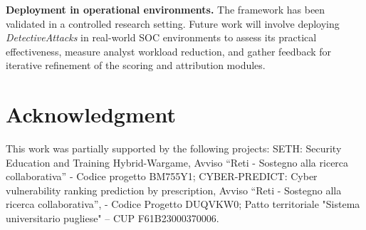 \documentclass[conference]{IEEEtran}
\begin{document}
\textbf{Deployment in operational environments.} The framework has been validated in a controlled research setting. Future work will involve deploying \textit{DetectiveAttacks} in real-world SOC environments to assess its practical effectiveness, measure analyst workload reduction, and gather feedback for iterative refinement of the scoring and attribution modules.

\section*{Acknowledgment}
This work was partially supported by the following projects: SETH: Security Education and Training Hybrid-Wargame, Avviso “Reti - Sostegno alla ricerca collaborativa” - Codice progetto BM755Y1; CYBER-PREDICT: Cyber vulnerability ranking prediction by prescription, Avviso “Reti - Sostegno alla ricerca collaborativa”, - Codice Progetto DUQVKW0; Patto territoriale "Sistema universitario pugliese" – CUP F61B23000370006.



\end{document}
